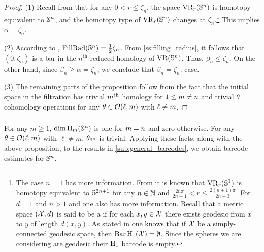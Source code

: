 \begin{proof}
	(1) Recall from \cite[Thm.~7.1]{lim2020vietoris} that for any $0 < r \leq \zeta_n$, the space $\operatorname{VR}_r(\mathbb{S}^n)$ is homotopy equivalent to $\mathbb{S}^n$, and the homotopy type of $\operatorname{VR}_r(\mathbb{S}^n)$ changes at $\zeta_n$.\footnote{
		The case $n = 1$ has more information.
		From \cite[Thm.~7.4]{adamaszek2017vietoris} it is known that $\operatorname{VR}_r(\mathbb{S}^1)$ is homotopy equivalent to $\mathbb{S}^{2n+1}$ for any $n \in \mathbb{N}$ and $\frac{2n\pi}{2n+1} < r \leq \frac{2(n+1)\pi}{2n+3}$.
		For $d=1$ and $n > 1$ and one also has more information.
		Recall that a metric space $(\mathcal{X}, d)$ is said to be a  if for each $x, y \in \mathcal{X}$ there exists geodesic from $x$ to $y$ of length $d(x, y)$.
		As stated in \cite[Prop.~7.10]{virk20201} one knows that if $\mathcal{X}$ be a simply-connected geodesic space, then $\operatorname{Bar}\mathrm{H}_1(\mathcal{X}) = \emptyset$.
		Since the spheres we are considering are geodesic their $\mathrm{H}_1$ barcode is empty.}
	This implies $\alpha=\zeta_n$.

	(2) According to \cite{katz1983filling}, \(\mathrm{FillRad}(\mathbb{S}^n) = \frac{1}{2}\zeta_n\).
	From \cref{ss:filling_radius}, it follows that \((0, \zeta_n)\) is a bar in the \(n^{\text{th}}\) reduced homology of \(\operatorname{VR} (\mathbb{S}^n)\).
	Thus, \(\beta_n \leq \zeta_n\).
	On the other hand, since \(\beta_n \geq \alpha = \zeta_n\), we conclude that \(\beta_n = \zeta_n\). case.


	(3) The remaining parts of the proposition follow from the fact that the initial space in the filtration has trivial $m^{\mathrm{th}}$ homology for $1\leq m \neq n$ and trivial $\theta$ cohomology operations for any \(\theta \in \mathcal{O}(\ell,m)\) with \(\ell \neq m\).
\end{proof}

\subsubsection{}

For any \(m \geq 1\), \(\dim \operatorname{H}_m(\mathbb{S}^n)\) is one for \(m = n\) and zero otherwise.
For any \(\theta \in \mathcal{O}(\ell, m)\) with \(\ell \neq m\), \(\theta_{\mathbb{S}^n}\) is trivial.
Applying these facts, along with the above proposition, to the results in \cref{sub:general_barcodes}, we obtain barcode estimates for \(\mathbb{S}^n\).

